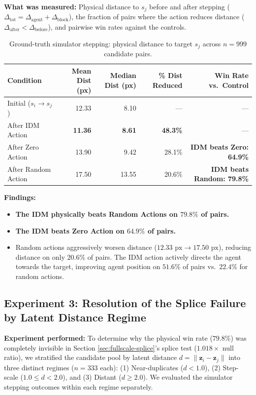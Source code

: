 \documentclass[11pt]{article}
\newcommand{\zv}{\mathbf{z}}
\begin{document}
\textbf{What was measured:} Physical distance to $s_j$ before and after stepping
($\Delta_{\mathrm{tot}} = \Delta_{\mathrm{agent}} + \Delta_{\mathrm{block}}$), the fraction of pairs where
the action reduces distance ($\Delta_{\mathrm{after}} < \Delta_{\mathrm{before}}$), and pairwise win rates
against the controls.

\begin{table}[H]
\centering
\small
\caption{Ground-truth simulator stepping: physical distance to target $s_j$ across $n=999$ candidate pairs.}
\begin{tabular}{@{}lrrrr@{}}
\toprule
Condition & Mean Dist (px) & Median Dist (px) & \% Dist Reduced & Win Rate vs.\ Control \\
\midrule
Initial ($s_i \to s_j$) & 12.33 & 8.10 & --- & --- \\
After IDM Action & \textbf{11.36} & \textbf{8.61} & \textbf{48.3\%} & --- \\
After Zero Action & 13.90 & 9.42 & 28.1\% & \textbf{IDM beats Zero: 64.9\%} \\
After Random Action & 17.50 & 13.55 & 20.6\% & \textbf{IDM beats Random: 79.8\%} \\
\bottomrule
\end{tabular}
\label{tab:simulator-stepping}
\end{table}

\textbf{Findings:}
\begin{itemize}[leftmargin=1.4em,itemsep=2pt]
\item \textbf{The IDM physically beats Random Actions on $79.8\%$ of pairs.}
\item \textbf{The IDM beats Zero Action on $64.9\%$ of pairs.}
\item Random actions aggressively worsen distance ($12.33\text{ px} \to 17.50\text{ px}$), reducing distance
on only $20.6\%$ of pairs. The IDM action actively directs the agent towards the target, improving agent position on
$51.6\%$ of pairs vs.\ $22.4\%$ for random actions.
\end{itemize}

\subsection{Experiment 3: Resolution of the Splice Failure by Latent Distance Regime}
\label{sec:exp3-regimes}

\textbf{Experiment performed:} To determine why the physical win rate ($79.8\%$) was completely invisible in
Section \ref{sec:fullscale-splice}'s splice test ($1.018\times$ null ratio), we stratified the candidate pool by
latent distance $d = \|\zv_i - \zv_j\|$ into three distinct regimes ($n=333$ each):
(1) Near-duplicates ($d < 1.0$),
(2) Step-scale ($1.0 \le d < 2.0$), and
(3) Distant ($d \ge 2.0$). We evaluated the simulator stepping outcomes within each regime separately.
\end{document}
